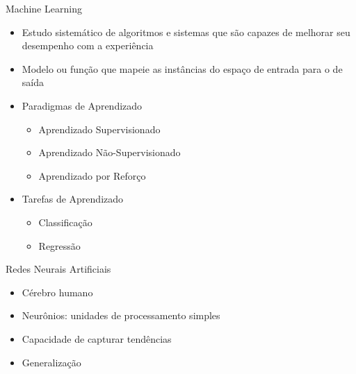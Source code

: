 %

\begin{frame}{Machine Learning}
   \ \  \\[0.1cm]
  \begin{itemize}
  \item Estudo sistemático de algoritmos e sistemas que são capazes de melhorar seu desempenho com a experiência
  \item Modelo ou função que mapeie as instâncias do espaço de entrada para o de saída
  \item Paradigmas de Aprendizado
  \begin{itemize}
    \item Aprendizado Supervisionado
    \item Aprendizado Não-Supervisionado
    \item Aprendizado por Reforço
  \end{itemize}
  \item Tarefas de Aprendizado
  \begin{itemize}
    \item Classificação
    \item Regressão
  \end{itemize}
\end{itemize}
\end{frame}

\begin{frame}{Redes Neurais Artificiais}
   \ \  \\[0.1cm]
  \begin{itemize}
  \item Cérebro humano
  \item Neurônios: unidades de processamento simples
  \item Capacidade de capturar tendências
  \item Generalização
\end{itemize}
\end{frame}

